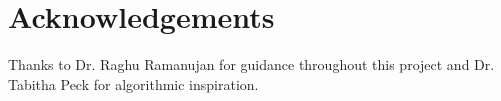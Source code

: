 
\section{Acknowledgements} 
\label{sec:ack} 

Thanks to Dr. Raghu Ramanujan for guidance throughout this project and Dr. Tabitha Peck for algorithmic inspiration.